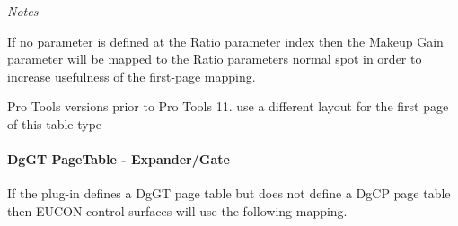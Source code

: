 {\itshape Notes} 
\begin{DoxyItemize}
\item If no parameter is defined at the Ratio parameter index then the Makeup Gain parameter will be mapped to the Ratio parameter\textquotesingle{}s normal spot in order to increase usefulness of the first-\/page mapping.  
\item Pro Tools versions prior to Pro Tools 11. use a different layout for the first page of this table type  
\end{DoxyItemize}

\hypertarget{a00833_aax_page_table_guide_04_avid_center_section_page_tables_eucon_mapping_DgGT}{}\paragraph{\textquotesingle{}\+Dg\+G\+T\textquotesingle{} Page\+Table -\/ Expander/\+Gate}\label{a00833_aax_page_table_guide_04_avid_center_section_page_tables_eucon_mapping_DgGT}
 If the plug-\/in defines a {\ttfamily \textquotesingle{}Dg\+GT\textquotesingle{}} page table but does not define a {\ttfamily \textquotesingle{}Dg\+CP\textquotesingle{}} page table then E\+U\+C\+ON control surfaces will use the following mapping.

